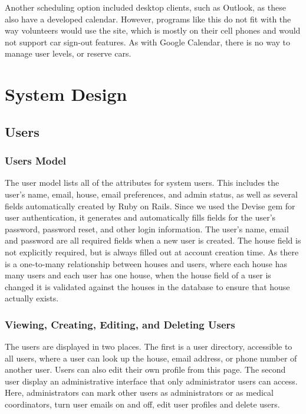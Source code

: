 \documentclass{sig-alternate}
\begin{document}
Another scheduling option included desktop clients, such as Outlook, as these also have a developed calendar.  However, programs like this do not fit with the way volunteers would use the site, which is mostly on their cell phones and would not support car sign-out features.  As with Google Calendar, there is no way to manage user levels, or reserve cars.

\section{System Design}

\subsection{Users}

\subsubsection{Users Model}
The user model lists all of the attributes for system users. This includes the user’s name, email, house, email preferences, and admin status, as well as several fields automatically created by Ruby on Rails. Since we used the Devise gem \cite{devise} for user authentication, it generates and automatically fills fields for the user's password, password reset, and other login information. The user's name, email and password are all required fields when a new user is created. The house field is not explicitly required, but is always filled out at account creation time. As there is a one-to-many relationship between houses and users, where each house has many users and each user has one house, when the house field of a user is changed it is validated against the houses in the database to ensure that house actually exists.

\subsubsection{Viewing, Creating, Editing, and Deleting Users}
The users are displayed in two places. The first is a user directory, accessible to all users, where a user can look up the house, email address, or phone number of another user. Users can also edit their own profile from this page. The second user display an administrative interface that only administrator users can access. Here, administrators can mark other users as administrators or as medical coordinators, turn user emails on and off, edit user profiles and delete users.
\end{document}
